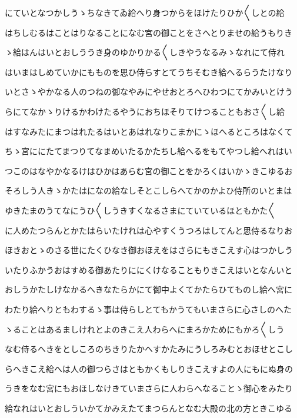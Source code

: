 \documentclass[a4paper,11pt,landscape]{ltjtarticle}
\begin{document}
\par\medskip
にていとなつかしうゝちなきてゐ給へり身つからをほけたりひか〱しとの給
\par\medskip
はちしむるはことはりなることになむ宮の御ことをさへとりませの給うもりき
\par\medskip
ゝ給はんはいとおしううき身のゆかりかる〱しきやうなるみゝなれにて侍れ
\par\medskip
はいまはしめていかにもものを思ひ侍らすとてうちそむき給へるらうたけなり
\par\medskip
いとさゝやかなる人のつねの御なやみにやせおとろへひわつにてかみいとけう
\par\medskip
らにてなかゝりけるかわけたるやうにおちほそりてけつることもおさ〱し給
\par\medskip
はすなみたにまつはれたるはいとあはれなりこまかにゝほへるところはなくて
\par\medskip
ちゝ宮ににたてまつりてなまめいたるかたちし給へるをもてやつし給へれはい
\par\medskip
つこのはなやかなるけはひかはあらむ宮の御ことをかろくはいかゝきこゆるお
\par\medskip
そろしう人きゝかたはになの給なしそとこしらへてかのかよひ侍所のいとまは
\par\medskip
ゆきたまのうてなにうひ〱しうきすくなるさまにていているほともかた〱
\par\medskip
に人めたつらんとかたはらいたけれは心やすくうつろはしてんと思侍るなりお
\par\medskip
ほきおとゝのさる世にたくひなき御おほえをはさらにもきこえす心はつかしう
\par\medskip
いたりふかうおはすめる御あたりににくけなることもりきこえはいとなんいと
\par\medskip
おしうかたしけなかるへきなたらかにて御中よくてかたらひてものし給へ宮に
\par\medskip
わたり給へりともわするゝ事は侍らしとてもかうてもいまさらに心さしのへた
\par\medskip
ゝることはあるましけれとよのきこえ人わらへにまろかためにもかろ〱しう
\par\medskip
なむ侍るへきをとしころのちきりたかへすかたみにうしろみむとおほせとこし
\par\medskip
らへきこえ給へは人の御つらさはともかくもしりきこえすよの人にもにぬ身の
\par\medskip
うきをなむ宮にもおほしなけきていまさらに人わらへなることゝ御心をみたり
\par\medskip
給なれはいとおしういかてかみえたてまつらんとなむ大殿の北の方ときこゆる
\par\medskip
\end{document}
